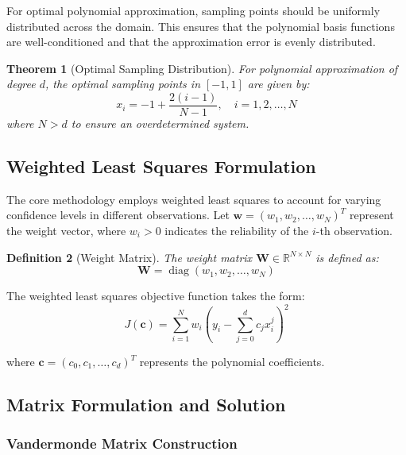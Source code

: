 \documentclass[12pt]{article}
\renewcommand{\vec}[1]{\mathbf{#1}}
\DeclareMathOperator{\diag}{diag}
\newtheorem{theorem}{Theorem}[section]
\newtheorem{definition}[theorem]{Definition}
\begin{document}
For optimal polynomial approximation, sampling points should be uniformly distributed across the domain. This ensures that the polynomial basis functions are well-conditioned and that the approximation error is evenly distributed.

\begin{theorem}[Optimal Sampling Distribution]
    \label{thm:optimal_sampling}
    For polynomial approximation of degree $d$, the optimal sampling points in $[-1, 1]$ are given by:
    \begin{equation}
        x_i = -1 + \frac{2(i-1)}{N-1}, \quad i = 1, 2, \ldots, N
    \end{equation}
    where $N > d$ to ensure an overdetermined system.
\end{theorem}

\subsection{Weighted Least Squares Formulation}

The core methodology employs weighted least squares to account for varying confidence levels in different observations. Let $\vec{w} = (w_1, w_2, \ldots, w_N)^T$ represent the weight vector, where $w_i > 0$ indicates the reliability of the $i$-th observation.

\begin{definition}[Weight Matrix]
    The weight matrix $\mathbf{W} \in \mathbb{R}^{N \times N}$ is defined as:
    \begin{equation}
        \mathbf{W} = \diag(w_1, w_2, \ldots, w_N)
    \end{equation}
\end{definition}

The weighted least squares objective function takes the form:
\begin{equation}
    \label{eq:wls_objective}
    J(\vec{c}) = \sum_{i=1}^N w_i \left( y_i - \sum_{j=0}^d c_j x_i^j \right)^2
\end{equation}

where $\vec{c} = (c_0, c_1, \ldots, c_d)^T$ represents the polynomial coefficients.

\subsection{Matrix Formulation and Solution}

\subsubsection{Vandermonde Matrix Construction}
\end{document}
